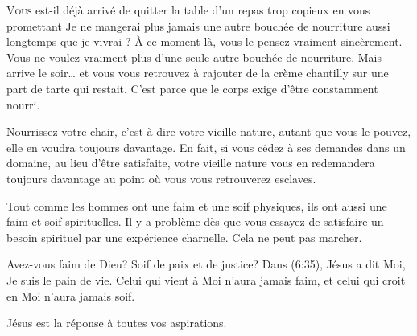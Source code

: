 



\lettrine{V}{ous} est-il déjà arrivé de quitter la table d'un repas
 trop copieux en vous promettant\frcolon{}
 \Og Je ne mangerai plus jamais une autre bouchée de nourriture aussi longtemps
 que je vivrai \Fg{}?
 À ce moment-là,  vous le pensez vraiment sincèrement.
 Vous ne voulez vraiment plus d'une seule autre bouchée de nourriture.
 Mais arrive le soir\dots{} et vous vous retrouvez à rajouter
 de la crème chantilly sur une part de tarte qui restait.
 C'est parce que le corps exige d'être constamment nourri.


Nourrissez votre chair, c'est-à-dire votre vieille nature,
 autant que vous le pouvez, elle en voudra toujours davantage.
 En fait,  si vous cédez à ses demandes dans un domaine,
 au lieu d'être satisfaite, votre vieille nature vous en redemandera
 toujours davantage au point où vous vous retrouverez 
 esclaves.

Tout comme les hommes ont une faim et une soif physiques,
 ils ont aussi une faim et soif spirituelles.
 Il y a problème dès que vous essayez de satisfaire un besoin spirituel
 par une expérience charnelle. Cela ne peut pas marcher.

Avez-vous  faim de Dieu? Soif de paix et de justice?
 Dans (6:35), Jésus a dit\frcolon{}
 \Og Moi, Je suis le pain de vie. Celui qui vient à Moi n'aura jamais faim,
 et celui qui croit en Moi n'aura jamais soif. \Fg{}

Jésus est la réponse à toutes vos aspirations. 

\dvrule


